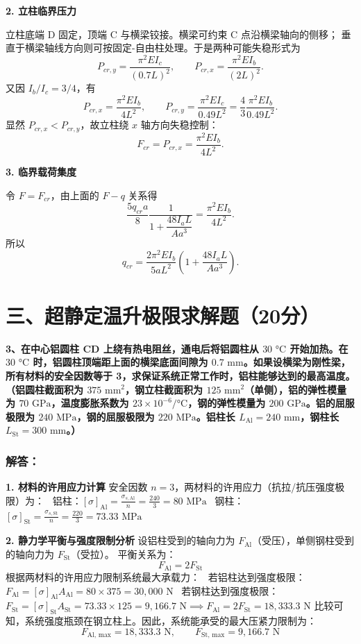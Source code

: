 \documentclass[11pt,a4paper]{ctexrep}
\begin{document}
{\textbf{2. 立柱临界压力}

立柱底端 D 固定，顶端 C 与横梁铰接。横梁可约束 C 点沿横梁轴向的侧移；
垂直于横梁轴线方向则可按固定-自由柱处理。于是两种可能失稳形式为
\[
    P_{cr,y}
    =
    \frac{\pi^2 E I_c}{(0.7L)^2},
    \qquad
    P_{cr,x}
    =
    \frac{\pi^2 E I_b}{(2L)^2}.
\]
又因 $I_b/I_c=3/4$，有
\[
    P_{cr,x}
    =
    \frac{\pi^2 E I_b}{4L^2},
    \qquad
    P_{cr,y}
    =
    \frac{\pi^2 E I_c}{0.49L^2}
    =
    \frac{4}{3}\frac{\pi^2 E I_b}{0.49L^2}.
\]
显然 $P_{cr,x}<P_{cr,y}$，故立柱绕 $x$ 轴方向失稳控制：
\[
    F_{cr}=P_{cr,x}=\frac{\pi^2 E I_b}{4L^2}.
\]

\textbf{3. 临界载荷集度}

令 $F=F_{cr}$，由上面的 $F-q$ 关系得
\[
    \frac{5q_{cr}a}{8}
    \frac{1}{1+\dfrac{48I_aL}{Aa^3}}
    =
    \frac{\pi^2 E I_b}{4L^2}.
\]
所以
\[
    q_{cr}
    =
    \frac{2\pi^2 E I_b}{5aL^2}
    \left(
    1+\frac{48I_aL}{Aa^3}
    \right).
\]



\section*{三、超静定温升极限求解题（20分）}

\textbf{3、在中心铝圆柱 CD 上绕有热电阻丝，通电后将铝圆柱从 $30\text{ °C}$ 开始加热。在 $30\text{ °C}$ 时，铝圆柱顶端距上面的横梁底面间隙为 $0.7\text{ mm}$。如果设横梁为刚性梁，所有材料的安全因数等于 3，求保证系统正常工作时，铝柱能够达到的最高温度。}
\textbf{（铝圆柱截面积为 $375\text{ mm}^2$，钢立柱截面积为 $125\text{ mm}^2$（单侧），铝的弹性模量为 $70\text{ GPa}$，温度膨胀系数为 $23 \times 10^{-6}/\text{°C}$，钢的弹性模量为 $200\text{ GPa}$。铝的屈服极限为 $240\text{ MPa}$，钢的屈服极限为 $220\text{ MPa}$。铝柱长 $L_{\text{Al}} = 240\text{ mm}$，钢柱长 $L_{\text{St}} = 300\text{ mm}$。）}

\subsubsection*{解答：}

\textbf{1. 材料的许用应力计算}
安全因数 $n = 3$，两材料的许用应力（抗拉/抗压强度极限）为：
\noindent\textbullet\ 铝柱：$[\sigma]_{\text{Al}} = \frac{\sigma_{s, \text{Al}}}{n} = \frac{240}{3} = 80\text{ MPa}$
\noindent\textbullet\ 钢柱：$[\sigma]_{\text{St}} = \frac{\sigma_{s, \text{St}}}{n} = \frac{220}{3} = 73.33\text{ MPa}$

\textbf{2. 静力学平衡与强度限制分析}
设铝柱受到的轴向力为 $F_{\text{Al}}$（受压），单侧钢柱受到的轴向力为 $F_{\text{St}}$（受拉）。
平衡关系为：
\[
    F_{\text{Al}} = 2 F_{\text{St}}
\]
根据两材料的许用应力限制系统最大承载力：
\noindent\textbullet\ 若铝柱达到强度极限：$F_{\text{Al}} = [\sigma]_{\text{Al}} A_{\text{Al}} = 80 \times 375 = 30,000\text{ N}$
\noindent\textbullet\ 若钢柱达到强度极限：$F_{\text{St}} = [\sigma]_{\text{St}} A_{\text{St}} = 73.33 \times 125 = 9,166.7\text{ N} \implies F_{\text{Al}} = 2 F_{\text{St}} = 18,333.3\text{ N}$
比较可知，系统强度瓶颈在钢立柱上。因此，系统能承受的最大压紧力限制为：
\[
    F_{\text{Al, max}} = 18,333.3\text{ N}, \qquad F_{\text{St, max}} = 9,166.7\text{ N}
\]

}
\end{document}
